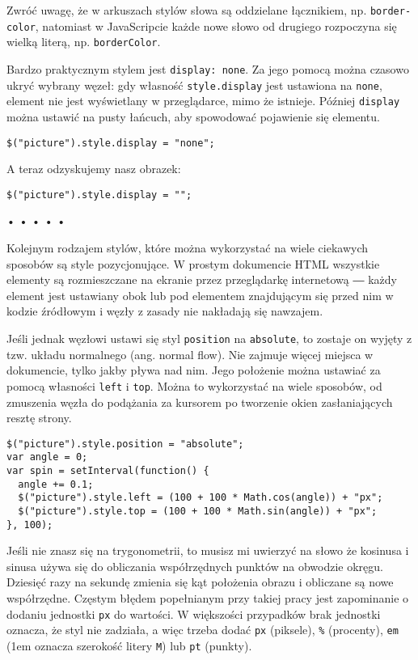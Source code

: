 Zwróć uwagę, że w arkuszach stylów słowa są oddzielane łącznikiem, np. \texttt{border-color}, natomiast w JavaScripcie każde nowe słowo od drugiego rozpoczyna się wielką literą, np. \texttt{borderColor}.

  
Bardzo praktycznym stylem jest \texttt{display: none}. Za jego pomocą można czasowo ukryć wybrany węzeł: gdy własność \texttt{style.display} jest ustawiona na \texttt{none}, element nie jest wyświetlany w przeglądarce, mimo że istnieje. Później \texttt{display} można ustawić na pusty łańcuch, aby spowodować pojawienie się elementu.

  
\begin{verbatim} 
$("picture").style.display = "none";
 \end{verbatim}
  
A teraz odzyskujemy nasz obrazek:

  
\begin{verbatim} 
$("picture").style.display = "";
 \end{verbatim}


\begin{center}
• • • • •
\end{center}

  
Kolejnym rodzajem stylów, które można wykorzystać na wiele ciekawych sposobów są style pozycjonujące. W prostym dokumencie HTML wszystkie elementy są rozmieszczane na ekranie przez przeglądarkę internetową ― każdy element jest ustawiany obok lub pod elementem znajdującym się przed nim w kodzie źródłowym i węzły z zasady nie nakładają się nawzajem.

  
Jeśli jednak węzłowi ustawi się styl \texttt{position} na \texttt{absolute}, to zostaje on wyjęty z tzw. układu normalnego (ang. normal flow). Nie zajmuje więcej miejsca w dokumencie, tylko jakby pływa nad nim. Jego położenie można ustawiać za pomocą własności \texttt{left} i \texttt{top}. Można to wykorzystać na wiele sposobów, od zmuszenia węzła do podążania za kursorem po tworzenie okien zasłaniających resztę strony.

  
\begin{verbatim} 
$("picture").style.position = "absolute";
var angle = 0;
var spin = setInterval(function() {
  angle += 0.1;
  $("picture").style.left = (100 + 100 * Math.cos(angle)) + "px";
  $("picture").style.top = (100 + 100 * Math.sin(angle)) + "px";
}, 100);
 \end{verbatim}
  
Jeśli nie znasz się na trygonometrii, to musisz mi uwierzyć na słowo że kosinusa i sinusa używa się do obliczania współrzędnych punktów na obwodzie okręgu. Dziesięć razy na sekundę zmienia się kąt położenia obrazu i obliczane są nowe współrzędne. Częstym błędem popełnianym przy takiej pracy jest zapominanie o dodaniu jednostki \texttt{px} do wartości. W większości przypadków brak jednostki oznacza, że styl nie zadziała, a więc trzeba dodać \texttt{px} (piksele), \texttt{\%} (procenty), \texttt{em} (1em oznacza szerokość litery \texttt{M}) lub \texttt{pt} (punkty).

